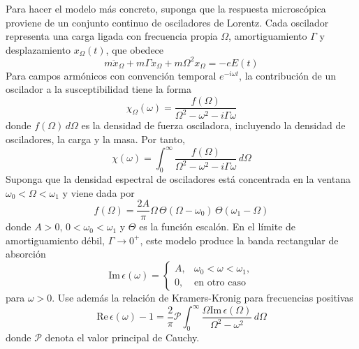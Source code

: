 \documentclass[]{article}
\numberwithin{equation}{section}
\begin{document}
\begin{enumerate}
	Para hacer el modelo más concreto, suponga que la respuesta microscópica proviene de un conjunto continuo de osciladores de Lorentz. Cada oscilador representa una carga ligada con frecuencia propia $\Omega$, amortiguamiento $\Gamma$ y desplazamiento $x_\Omega(t)$, que obedece
	\begin{equation}
		m \ddot{x}_\Omega + m \Gamma \dot{x}_\Omega + m\Omega^2 x_\Omega = - e E(t)
	\end{equation}
	Para campos armónicos con convención temporal $e^{-i \omega t}$, la contribución de un oscilador a la susceptibilidad tiene la forma
	\begin{equation}
		\chi_\Omega(\omega) = \frac{f(\Omega)}{\Omega^2 - \omega^2 - i \Gamma \omega}
	\end{equation}
	donde $f(\Omega) \, d\Omega$ es la densidad de fuerza osciladora, incluyendo la densidad de osciladores, la carga y la masa. Por tanto,
	\begin{equation}
		\chi(\omega) = \int_{0}^{\infty} \frac{f(\Omega)}{\Omega^2 - \omega^2 - i \Gamma \omega} \, d\Omega \label{(5)}
	\end{equation}
	Suponga que la densidad espectral de osciladores está concentrada en la ventana $\omega_0 < \Omega < \omega_1$ y viene dada por
	\begin{equation}
		f(\Omega) = \frac{2 A}{\pi} \Omega \, \Theta(\Omega - \omega_0) \, \Theta( \omega_1 - \Omega) \label{(6)}
	\end{equation}
	donde $A > 0, \, 0 < \omega_0 < \omega_1$ y $\Theta$ es la función escalón. En el límite de amortiguamiento débil, $\Gamma \to 0^{+}$, este modelo produce la banda rectangular de absorción
	\begin{equation}
		\mathrm{Im} \, \epsilon(\omega) = \left\{\begin{matrix}
			A, & \omega_0 < \omega < \omega_1,\\
			0, & \text{en otro caso}
		\end{matrix}\right. \label{(7)}
	\end{equation}
	para $\omega > 0 $.
	Use además la relación de Kramers-Kronig para frecuencias positivas
	\begin{equation}
		\mathrm{Re} \, \epsilon(\omega) - 1 = \frac{2}{\pi} \mathcal{P} \int_{0}^{\infty} \frac{\Omega \mathrm{Im}\, \epsilon(\Omega)}{\Omega^2 - \omega^2} \, d\Omega
	\end{equation}
	donde $\mathcal{P}$ denota el valor principal de Cauchy.
	\begin{enumerate}

\end{enumerate}
\end{enumerate}
\end{document}
